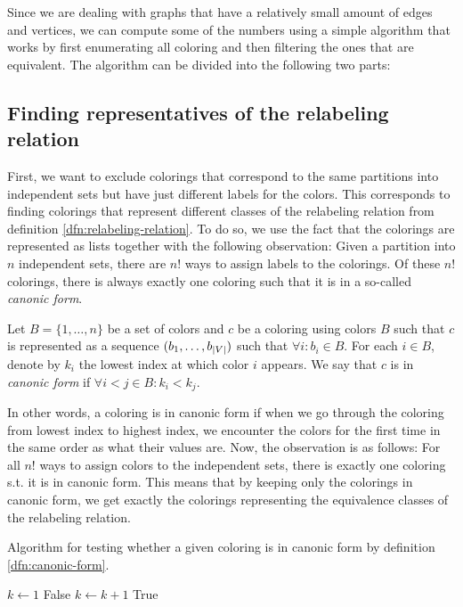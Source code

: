 Since we are dealing with graphs that have a relatively small amount of edges and vertices, we can compute some of the numbers using a simple algorithm that works by first enumerating all coloring and then filtering the ones that are equivalent. The algorithm can be divided into the following two parts:

\subsection{Finding representatives of the relabeling relation}

First, we want to exclude colorings that correspond to the same partitions into independent sets but have just different labels for the colors. This corresponds to finding colorings that represent different classes of the relabeling relation from definition \ref{dfn:relabeling-relation}. To do so, we use the fact that the colorings are represented as lists together with the following observation: Given a partition into $n$ independent sets, there are $n!$ ways to assign labels to the colorings. Of these $n!$ colorings, there is always exactly one coloring such that it is in a so-called \textit{canonic form}.  

\begin{defn}\label{dfn:canonic-form}
    Let $B=\{1,\ldots,n\}$ be a set of colors and $c$ be a coloring using colors $B$ such that $c$ is represented as a sequence $(b_1, \ldots,b_{\left|{V}\right|})$ such that $\forall i: b_i \in B$. For each $i \in B$, denote by $k_i$ the lowest index at which color $i$ appears. We say that $c$ is in \emph{canonic form} if $\forall i < j \in B: k_i < k_j$.
\end{defn}

In other words, a coloring is in canonic form if when we go through the coloring from lowest index to highest index, we encounter the colors for the first time in the same order as what their values are. Now, the observation is as follows: For all $n!$ ways to assign colors to the independent sets, there is exactly one coloring s.t. it is in canonic form. This means that by keeping only the colorings in canonic form, we get exactly the colorings representing the equivalence classes of the relabeling relation.

\begin{algorithm}[H]
    \caption{Algorithm for testing whether a given coloring is in canonic form by definition \ref{dfn:canonic-form}.} 
    \begin{algorithmic}[1]
            \State $k \gets 1$      
                    \State \Return False
                \EndIf
                    \State $k \gets k + 1$
                \EndIf
            \EndFor   
            \State \Return True
        \EndFunction
    \end{algorithmic}
    \label{alg:is-in-canonic-form}
\end{algorithm}


